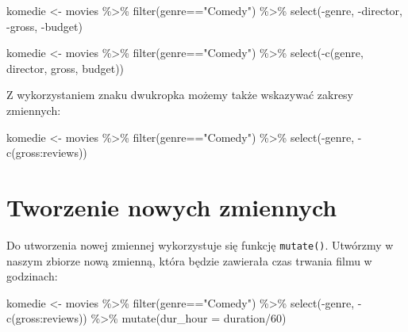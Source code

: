 \documentclass[
]{book}
\newenvironment{Shaded}{\begin{snugshade}}{\end{snugshade}}
\newcommand{\AttributeTok}[1]{\textcolor[rgb]{0.77,0.63,0.00}{#1}}
\newcommand{\DecValTok}[1]{\textcolor[rgb]{0.00,0.00,0.81}{#1}}
\newcommand{\FunctionTok}[1]{\textcolor[rgb]{0.00,0.00,0.00}{#1}}
\newcommand{\NormalTok}[1]{#1}
\newcommand{\OtherTok}[1]{\textcolor[rgb]{0.56,0.35,0.01}{#1}}
\newcommand{\SpecialCharTok}[1]{\textcolor[rgb]{0.00,0.00,0.00}{#1}}
\newcommand{\StringTok}[1]{\textcolor[rgb]{0.31,0.60,0.02}{#1}}
\begin{document}
\begin{Shaded}
\begin{Highlighting}[]
\NormalTok{komedie }\OtherTok{\textless{}{-}}\NormalTok{ movies }\SpecialCharTok{\%\textgreater{}\%}
  \FunctionTok{filter}\NormalTok{(genre}\SpecialCharTok{==}\StringTok{"Comedy"}\NormalTok{) }\SpecialCharTok{\%\textgreater{}\%}
  \FunctionTok{select}\NormalTok{(}\SpecialCharTok{{-}}\NormalTok{genre, }\SpecialCharTok{{-}}\NormalTok{director, }\SpecialCharTok{{-}}\NormalTok{gross, }\SpecialCharTok{{-}}\NormalTok{budget)}


\NormalTok{komedie }\OtherTok{\textless{}{-}}\NormalTok{ movies }\SpecialCharTok{\%\textgreater{}\%}
  \FunctionTok{filter}\NormalTok{(genre}\SpecialCharTok{==}\StringTok{"Comedy"}\NormalTok{) }\SpecialCharTok{\%\textgreater{}\%}
  \FunctionTok{select}\NormalTok{(}\SpecialCharTok{{-}}\FunctionTok{c}\NormalTok{(genre, director, gross, budget))}
\end{Highlighting}
\end{Shaded}

Z wykorzystaniem znaku dwukropka możemy także wskazywać zakresy zmiennych:

\begin{Shaded}
\begin{Highlighting}[]
\NormalTok{komedie }\OtherTok{\textless{}{-}}\NormalTok{ movies }\SpecialCharTok{\%\textgreater{}\%}
  \FunctionTok{filter}\NormalTok{(genre}\SpecialCharTok{==}\StringTok{"Comedy"}\NormalTok{) }\SpecialCharTok{\%\textgreater{}\%}
  \FunctionTok{select}\NormalTok{(}\SpecialCharTok{{-}}\NormalTok{genre, }\SpecialCharTok{{-}}\FunctionTok{c}\NormalTok{(gross}\SpecialCharTok{:}\NormalTok{reviews))}
\end{Highlighting}
\end{Shaded}

\hypertarget{tworzenie-nowych-zmiennych}{%
\section{Tworzenie nowych zmiennych}\label{tworzenie-nowych-zmiennych}}

Do utworzenia nowej zmiennej wykorzystuje się funkcję \texttt{mutate()}. Utwórzmy w naszym zbiorze nową zmienną, która będzie zawierała czas trwania filmu w godzinach:

\begin{Shaded}
\begin{Highlighting}[]
\NormalTok{komedie }\OtherTok{\textless{}{-}}\NormalTok{ movies }\SpecialCharTok{\%\textgreater{}\%}
  \FunctionTok{filter}\NormalTok{(genre}\SpecialCharTok{==}\StringTok{"Comedy"}\NormalTok{) }\SpecialCharTok{\%\textgreater{}\%}
  \FunctionTok{select}\NormalTok{(}\SpecialCharTok{{-}}\NormalTok{genre, }\SpecialCharTok{{-}}\FunctionTok{c}\NormalTok{(gross}\SpecialCharTok{:}\NormalTok{reviews)) }\SpecialCharTok{\%\textgreater{}\%}
  \FunctionTok{mutate}\NormalTok{(}\AttributeTok{dur\_hour =}\NormalTok{ duration}\SpecialCharTok{/}\DecValTok{60}\NormalTok{)}
\end{Highlighting}
\end{Shaded}
\end{document}
